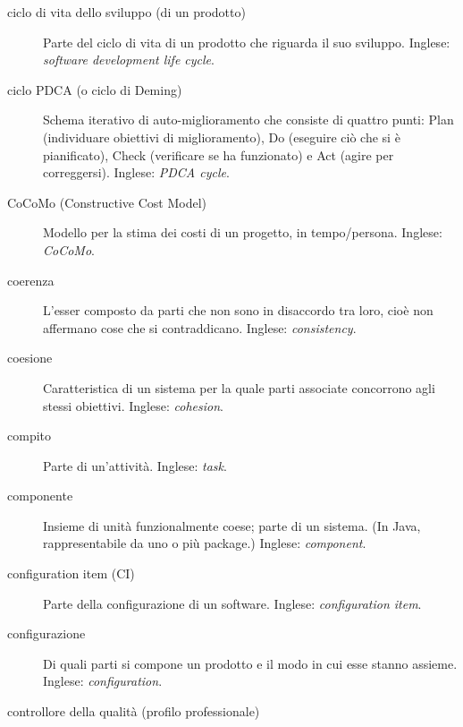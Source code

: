 \documentclass[a4paper]{article}
\begin{document}
\begin{description}
	\item[ciclo di vita dello sviluppo (di un prodotto)] 

			Parte del ciclo di vita di un prodotto che riguarda il suo sviluppo. Inglese: \emph{software development life cycle}.
			
	\item[ciclo PDCA (o ciclo di Deming)] 

			Schema iterativo di auto-miglioramento che consiste di quattro punti: Plan (individuare obiettivi di miglioramento), Do (eseguire ciò che si è pianificato), Check (verificare se ha funzionato) e Act (agire per correggersi). Inglese: \emph{PDCA cycle}.
			
	\item[CoCoMo (Constructive Cost Model)] 

			Modello per la stima dei costi di un progetto, in tempo/persona. Inglese: \emph{CoCoMo}.
			
	\item[coerenza] 

			L'esser composto da parti che non sono in disaccordo tra loro, cioè non affermano cose che si contraddicano. Inglese: \emph{consistency}.
			
	\item[coesione] 

			Caratteristica di un sistema per la quale parti associate concorrono agli stessi obiettivi. Inglese: \emph{cohesion}.
			
	\item[compito] 

			Parte di un'attività. Inglese: \emph{task}.
			
	\item[componente] 

			Insieme di unità funzionalmente coese; parte di un sistema. (In Java, rappresentabile da uno o più package.) Inglese: \emph{component}.
			
	\item[configuration item (CI)] 

			Parte della configurazione di un software. Inglese: \emph{configuration item}.
			
	\item[configurazione] 

			Di quali parti si compone un prodotto e il modo in cui esse stanno assieme. Inglese: \emph{configuration}.
			
	\item[controllore della qualità (profilo professionale)] 


\end{description}
\end{document}
